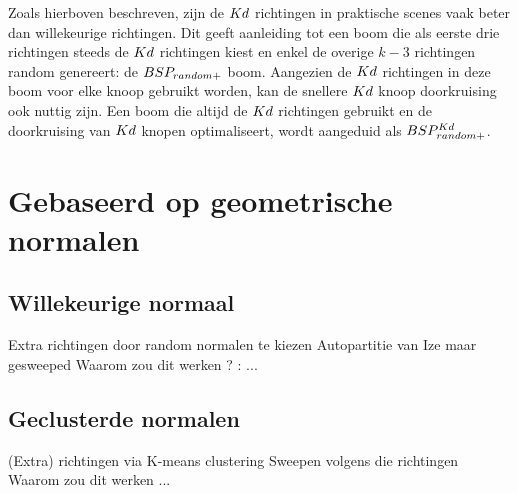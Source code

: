 Zoals hierboven beschreven, zijn de $Kd$ richtingen in praktische scenes vaak beter dan willekeurige richtingen.
Dit geeft aanleiding tot een boom die als eerste drie richtingen steeds de $Kd$ richtingen kiest en enkel de overige $k - 3$ richtingen random genereert: de $BSP_{random+}$ boom. Aangezien de $Kd$ richtingen in deze boom voor elke knoop gebruikt worden, kan de snellere $Kd$ knoop doorkruising ook nuttig zijn. Een boom die altijd de $Kd$ richtingen gebruikt en de doorkruising van $Kd$ knopen optimaliseert, wordt aangeduid als $BSP^{Kd}_{random+}$.


\section{Gebaseerd op geometrische normalen}
\subsection{Willekeurige normaal}
    Extra richtingen door random normalen te kiezen
    Autopartitie van Ize maar gesweeped
    Waarom zou dit werken ? : ...
    
\subsection{Geclusterde normalen}
    (Extra) richtingen via K-means clustering
    Sweepen volgens die richtingen
    Waarom zou dit werken ...



